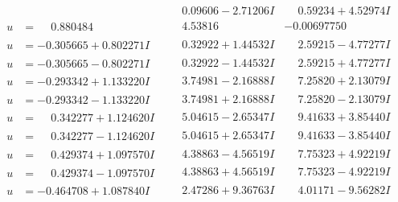 \documentclass[1p]{elsarticle_modified}
\theoremstyle{definition}
\begin{document}
$$\begin{array}{c|c|c}
 & \phantom{-}0.09606 - 2.71206 I & \phantom{-}0.59234 + 4.52974 I \\ \hline\begin{aligned}
u &= \phantom{-}0.880484\phantom{ +0.000000I}\end{aligned}
 & \phantom{-}4.53816\phantom{ +0.000000I} & -0.00697750\phantom{ +0.000000I} \\ \hline\begin{aligned}
u &= -0.305665 + 0.802271 I\end{aligned}
 & \phantom{-}0.32922 + 1.44532 I & \phantom{-}2.59215 - 4.77277 I \\ \hline\begin{aligned}
u &= -0.305665 - 0.802271 I\end{aligned}
 & \phantom{-}0.32922 - 1.44532 I & \phantom{-}2.59215 + 4.77277 I \\ \hline\begin{aligned}
u &= -0.293342 + 1.133220 I\end{aligned}
 & \phantom{-}3.74981 - 2.16888 I & \phantom{-}7.25820 + 2.13079 I \\ \hline\begin{aligned}
u &= -0.293342 - 1.133220 I\end{aligned}
 & \phantom{-}3.74981 + 2.16888 I & \phantom{-}7.25820 - 2.13079 I \\ \hline\begin{aligned}
u &= \phantom{-}0.342277 + 1.124620 I\end{aligned}
 & \phantom{-}5.04615 - 2.65347 I & \phantom{-}9.41633 + 3.85440 I \\ \hline\begin{aligned}
u &= \phantom{-}0.342277 - 1.124620 I\end{aligned}
 & \phantom{-}5.04615 + 2.65347 I & \phantom{-}9.41633 - 3.85440 I \\ \hline\begin{aligned}
u &= \phantom{-}0.429374 + 1.097570 I\end{aligned}
 & \phantom{-}4.38863 - 4.56519 I & \phantom{-}7.75323 + 4.92219 I \\ \hline\begin{aligned}
u &= \phantom{-}0.429374 - 1.097570 I\end{aligned}
 & \phantom{-}4.38863 + 4.56519 I & \phantom{-}7.75323 - 4.92219 I \\ \hline\begin{aligned}
u &= -0.464708 + 1.087840 I\end{aligned}
 & \phantom{-}2.47286 + 9.36763 I & \phantom{-}4.01171 - 9.56282 I \\ \hline\begin{aligned}

\end{aligned}
\end{array}$$
\end{document}
